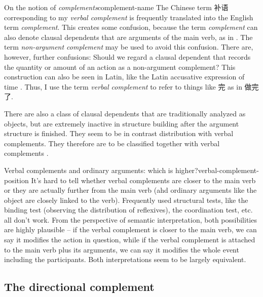 \documentclass[UTF8, a4paper, oneside, scheme=plain, 12pt]{ctexrep}
\newcommand*{\citesec}[1]{\S~{#1}}
\newcommand*{\citepages}[1]{pp.~{#1}}
\newcommand*{\term}[1]{\emph{#1}}
\begin{document}
\begin{infobox}{On the notion of \term{complements}}{complement-name}
    The Chinese term 补语 corresponding to my \term{verbal complement}
    is frequently translated into the English term \term{complement}.
    This creates some confusion,
    because the term \term{complement} can also denote 
    clausal dependents that are arguments of the main verb, as in \citet{cgel}.
    The term \term{non-argument complement} may be used to avoid this confusion.
    There are, however, further confusions:
    Should we regard a clausal dependent that records the quantity or amount of an action 
    as a non-argument complement?
    This construction can also be seen in Latin, 
    like the Latin accusative expression of time \citep[\citesec{423}]{greenough2013allen}.
    Thus, I use the term \term{verbal complement} to refer to 
    things like 完 as in 做完了.
\end{infobox}

There are also a class of clausal dependents 
that are traditionally analyzed as objects,
but are extremely inactive in structure building 
after the argument structure is finished.
They seem to be in contrast distribution with verbal complements.
They therefore are to be classified together with verbal complements
\citep[\citepages{188-190}]{deng2010formal}.

\begin{infobox}{Verbal complements and ordinary arguments: which is higher?}{verbal-complement-position}
    It's hard to tell whether verbal complements are closer to the main verb 
    or they are actually further from the main verb 
    (ahd ordinary arguments like the object are closely linked to the verb).
    Frequently used structural tests, 
    like the binding test (observing the distribution of reflexives),
    the coordination test, etc. all don't work. 
    From the perspective of semantic interpretation, 
    both possibilities are highly plausible -- 
    if the verbal complement is closer to the main verb,
    we can say it modifies the action in question,
    while if the verbal complement is attached to the main verb plus its arguments,
    we can say it modifies the whole event including the participants.
    Both interpretations seem to be largely equivalent.
\end{infobox}

\subsection{The directional complement}
\end{document}
